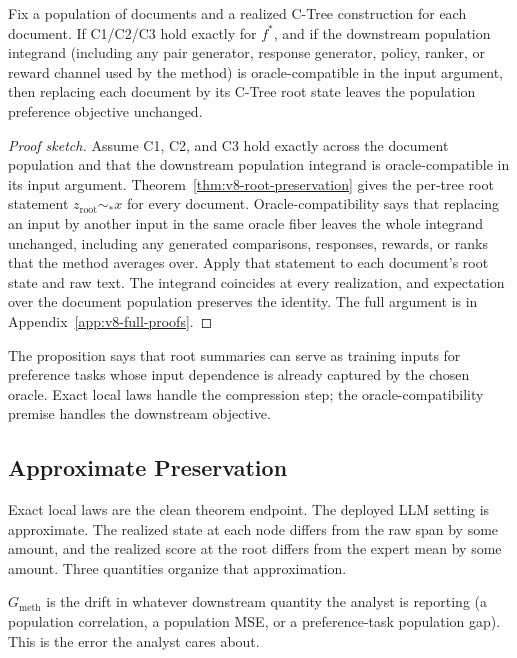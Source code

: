 \begin{proposition}
\label{prop:v8-manifesto-preference-equivalence}
Fix a population of documents and a realized C-Tree construction for each
document. If C1/C2/C3 hold exactly for \(f^\ast\), and if the downstream
population integrand (including any pair generator, response generator,
policy, ranker, or reward channel used by the method) is oracle-compatible in
the input argument, then replacing each document by its C-Tree root state
leaves the population preference objective unchanged.
\end{proposition}

\begin{proof}[Proof sketch]
Assume C1, C2, and C3 hold exactly across the document population
and that the downstream population integrand is oracle-compatible
in its input argument. Theorem~\ref{thm:v8-root-preservation} gives
the per-tree root statement \(z_{\mathrm{root}}\sim_\ast x\) for
every document. Oracle-compatibility says that replacing an input
by another input in the same oracle fiber leaves the whole
integrand unchanged, including any generated comparisons,
responses, rewards, or ranks that the method averages over. Apply
that statement to each document's root state and raw text. The
integrand coincides at every realization, and expectation over the
document population preserves the identity. The full argument is in
Appendix~\ref{app:v8-full-proofs}.
\end{proof}

The proposition says that root summaries can serve as training
inputs for preference tasks whose input dependence is already
captured by the chosen oracle. Exact local laws handle the
compression step; the oracle-compatibility premise handles the
downstream objective.

\subsection{Approximate Preservation}

Exact local laws are the clean theorem endpoint. The deployed LLM
setting is approximate. The realized state at each node differs from
the raw span by some amount, and the realized score at the root
differs from the expert mean by some amount. Three quantities organize
that approximation.

\(G_{\mathrm{meth}}\) is the drift in whatever downstream quantity the
analyst is reporting (a population correlation, a population MSE, or a
preference-task population gap). This is the error the analyst cares
about.

